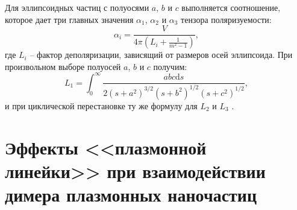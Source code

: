 Для эллипсоидных частиц с полуосями $ a $, $ b $ и $ c $ выполняется соотношение, которое дает три главных значения $ \alpha_1 $, $ \alpha_2 $ и $ \alpha_3 $ тензора поляризуемости:
\begin{equation}
\alpha _i = \frac{V}{4 \pi (L_i + \frac{1}{m^2 - 1})},
\label{eq:polarizabilityEllip}
\end{equation}
где $ L_i $ -- фактор деполяризации, зависящий от размеров осей эллипсоида. При произвольном выборе полуосей $ a $, $ b $ и $ c $ получим:
\begin{equation}
L_1 = \int_0^\infty \frac{a b c \mathrm{d} s}{2 (s + a^2)^{3/2} (s + b^2)^{1/2} (s + c^2)^{1/2}},
\label{eq:Lfactor}
\end{equation}
и при циклической перестановке ту же формулу для $ L_2 $ и $ L_3 $ \cite{LPP_Hulst}.

\section{Эффекты  <<плазмонной линейки>> при взаимодействии димера плазмонных наночастиц}


